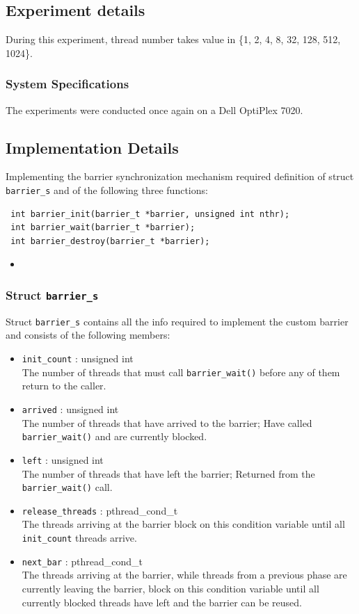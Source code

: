 \documentclass{article}
\newcommand{\cscript}[2]{
\begin{itemize}
\item[]
\end{itemize}
}
\def\code#1{\texttt{#1}}
\begin{document}
\subsection{Experiment details}
During this experiment, thread number takes value in \{1, 2, 4, 8, 32, 128, 512, 1024\}.

\subsubsection{System Specifications}
The experiments were conducted once again on a Dell OptiPlex 7020.

\subsection{Implementation Details}
Implementing the barrier synchronization mechanism required definition of struct
\code{barrier\_s} and of the following three functions:

\begin{verbatim}
 int barrier_init(barrier_t *barrier, unsigned int nthr);
 int barrier_wait(barrier_t *barrier);
 int barrier_destroy(barrier_t *barrier);
\end{verbatim}

\cscript{code/barrier_s}{Struct \code{barrier\_s}}

\subsubsection{Struct \code{barrier\_s}}
Struct \code{barrier\_s} contains all the info required to implement the custom barrier and
consists of the following members:
\begin{itemize}
  \item \code{init\_count} : unsigned int \\
        The number of threads that must call \code{barrier\_wait()} before any of them
        return to the caller.
  \item \code{arrived} : unsigned int \\
        The number of threads that have arrived to the barrier; Have called \code{barrier\_wait()}
        and are currently blocked.
  \item \code{left} : unsigned int \\
        The number of threads that have left the barrier; Returned from the \code{barrier\_wait()}
        call.
  \item \code{release\_threads} : pthread\_cond\_t \\
        The threads arriving at the barrier block on this condition variable until all
        \code{init\_count} threads arrive.
  \item \code{next\_bar} : pthread\_cond\_t \\
        The threads arriving at the barrier, while threads from a previous phase are currently
        leaving the barrier, block on this condition variable until all currently blocked
        threads have left and the barrier can be reused.
\end{itemize}
\end{document}

